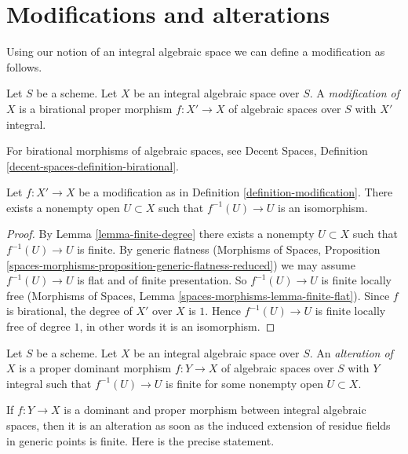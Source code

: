 \section{Modifications and alterations}
\label{section-modifications-alterations}

\noindent
Using our notion of an integral algebraic space we can define a modification
as follows.

\begin{definition}
\label{definition-modification}
Let $S$ be a scheme. Let $X$ be an integral algebraic space over $S$. A
{\it modification of $X$} is a birational proper morphism
$f : X' \to X$ of algebraic spaces over $S$ with $X'$ integral.
\end{definition}

\noindent
For birational morphisms of algebraic spaces, see
Decent Spaces, Definition \ref{decent-spaces-definition-birational}.

\begin{lemma}
\label{lemma-modification-iso-over-open}
Let $f : X' \to X$ be a modification as in
Definition \ref{definition-modification}.
There exists a nonempty open $U \subset X$ such that $f^{-1}(U) \to U$
is an isomorphism.
\end{lemma}

\begin{proof}
By
Lemma \ref{lemma-finite-degree} there exists a nonempty $U \subset X$ such
that $f^{-1}(U) \to U$ is finite. By generic flatness
(Morphisms of Spaces, Proposition
\ref{spaces-morphisms-proposition-generic-flatness-reduced})
we may assume $f^{-1}(U) \to U$ is flat and of finite presentation.
So $f^{-1}(U) \to U$ is finite locally free
(Morphisms of Spaces, Lemma \ref{spaces-morphisms-lemma-finite-flat}).
Since $f$ is birational, the degree of $X'$ over $X$ is $1$.
Hence $f^{-1}(U) \to U$ is finite locally free of degree $1$,
in other words it is an isomorphism.
\end{proof}

\begin{definition}
\label{definition-alteration}
Let $S$ be a scheme. Let $X$ be an integral algebraic space over $S$.
An {\it alteration of $X$} is a proper dominant morphism $f : Y \to X$
of algebraic spaces over $S$ with $Y$ integral such that $f^{-1}(U) \to U$
is finite for some nonempty open $U \subset X$.
\end{definition}

\noindent
If $f : Y \to X$ is a dominant and proper morphism between integral
algebraic spaces, then it is an alteration as soon as the induced
extension of residue fields in generic points is finite. Here is the
precise statement.

